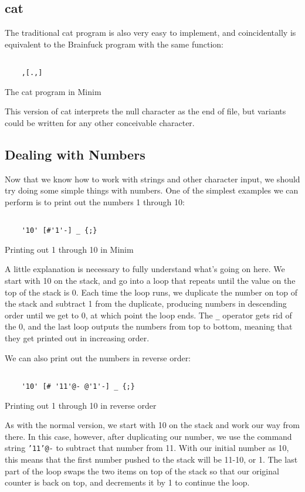\documentclass{article}
\begin{document}
\subsection{cat}
The traditional cat program is also very easy to implement, and coincidentally is equivalent to the Brainfuck program with the same function:
\begin{program}
	\begin{verbatim}
	
	,[.,]
	\end{verbatim}
	\caption{The cat program in Minim}
\end{program}
This version of cat interprets the null character as the end of file, but variants could be written for any other conceivable character.
\subsection{Dealing with Numbers}
Now that we know how to work with strings and other character input, we should try doing some simple things with numbers. One of the simplest examples we can perform is to print out the numbers 1 through 10:
\begin{program}
	\begin{verbatim}
	
	'10' [#'1'-] _ {;}
	\end{verbatim}
	\caption{Printing out 1 through 10 in Minim}
\end{program}
A little explanation is necessary to fully understand what's going on here. We start with 10 on the stack, and go into a loop that repeats until the value on the top of the stack is 0. Each time the loop runs, we duplicate the number on top of the stack and subtract 1 from the duplicate, producing numbers in descending order until we get to 0, at which point the loop ends. The \texttt{\_} operator gets rid of the 0, and the last loop outputs the numbers from top to bottom, meaning that they get printed out in increasing order.

We can also print out the numbers in reverse order:
\begin{program}
	\begin{verbatim}
	
	'10' [# '11'@- @'1'-] _ {;}
	\end{verbatim}
	\caption{Printing out 1 through 10 in reverse order}
\end{program}
As with the normal version, we start with 10 on the stack and work our way from there. In this case, however, after duplicating our number, we use the command string \texttt{'11'@-} to subtract that number from 11. With our initial number as 10, this means that the first number pushed to the stack will be 11-10, or 1. The last part of the loop swaps the two items on top of the stack so that our original counter is back on top, and decrements it by 1 to continue the loop.
\end{document}
